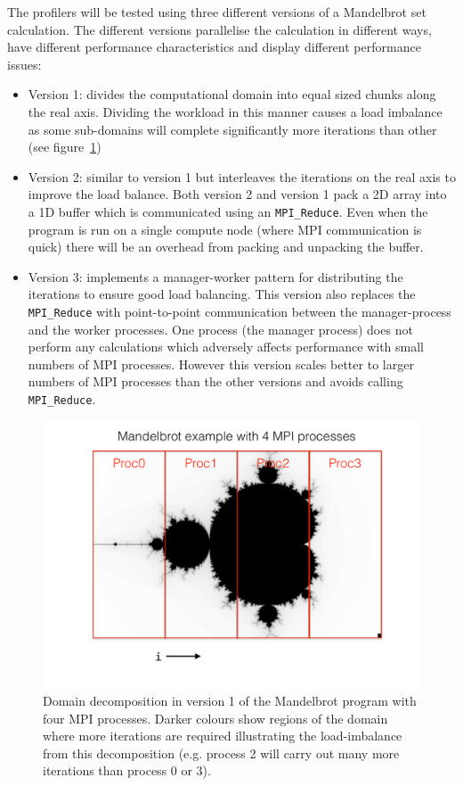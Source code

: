 \documentclass[a4paper,titlepage]{article}
\begin{document}
The profilers will be tested using three different versions of a Mandelbrot set calculation. The different versions parallelise the calculation in different ways, have different performance characteristics and display different performance issues:
\begin{itemize}
\item Version 1: divides the computational domain into equal sized chunks along the real axis. Dividing the workload in this manner causes a load imbalance as some sub-domains will complete significantly more iterations than other (see figure~\ref{fig:mandelbrot_dd})
\item Version 2: similar to version 1 but interleaves the iterations on the real axis to improve the load balance. Both version 2 and version 1 pack a 2D array into a 1D buffer which is communicated using an \verb+MPI_Reduce+. Even when the program is run on a single compute node (where MPI communication is quick) there will be an overhead from packing and unpacking the buffer.
\item Version 3: implements a manager-worker pattern for distributing the iterations to ensure good load balancing. This version also replaces the \verb+MPI_Reduce+ with point-to-point communication between the manager-process and the worker processes. One process (the manager process) does not perform any calculations which adversely affects performance with small numbers of MPI processes. However this version scales better to larger numbers of MPI processes than the other versions and avoids calling \verb+MPI_Reduce+.
\end{itemize}
\begin{figure}[htbp]
\begin{center}
\includegraphics[scale=0.5]{figures/mandelbrot_dd}
\caption{Domain decomposition in version 1 of the Mandelbrot program with four MPI processes. Darker colours show regions of the domain where more iterations are required illustrating the load-imbalance from this decomposition (e.g. process 2 will carry out many more iterations than process 0 or 3).}
\label{fig:mandelbrot_dd}
\end{center}
\end{figure}
\end{document}
